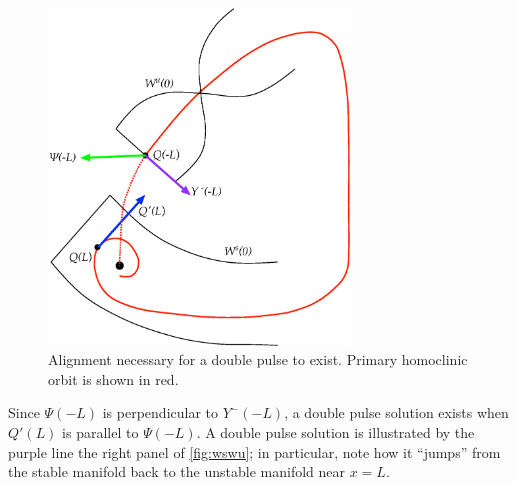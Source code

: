 \documentclass[thesis.tex]{subfiles}
\begin{document}
\begin{figure}
\begin{center}
\includegraphics[width=8cm]{images/intro/manifoldslineup}
\caption[Alignment of manifolds necessary for a double pulse]{Alignment necessary for a double pulse to exist. Primary homoclinic orbit is shown in red.}
\label{fig:manifoldslineup}
\end{center}
\end{figure}
Since $\Psi(-L)$ is perpendicular to $Y^-(-L)$, a double pulse solution exists when $Q'(L)$ is parallel to $\Psi(-L)$. A double pulse solution is illustrated by the purple line the right panel of \cref{fig:wswu}; in particular, note how it ``jumps'' from the stable manifold back to the unstable manifold near $x = L$.
\end{document}
